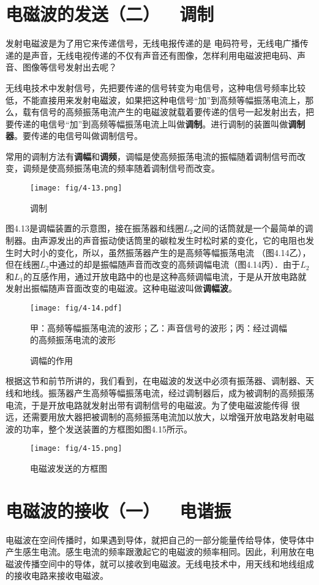 \section{电磁波的发送（二）~~调制}
发射电磁波是为了用它来传递信号，无线电报传递的是
电码符号，无线电广播传递的是声音，无线电视传递的不仅有声音还有图像，怎样利用电磁波把电码、声音、图像等信号发射出去呢？

无线电技术中发射信号，先把要传递的信号转变为电信号，这种电信号频率比较低，不能直接用来发射电磁波，如果把这种电信号“加”到高频等幅振荡电流上，那么，载有信号的高频振荡电流产生的电磁波就载着要传递的信号一起发射出去，把要传递的电信号“加”到高频等幅振荡电流上叫做\textbf{调制}。进行调制的装置叫做\textbf{调制器}。要传递的电信号叫做调制信号。

常用的调制方法有\textbf{调幅}和\textbf{调频}，调幅是使高频振荡电流的振幅随着调制信号而改变，调频是使高频振荡电流的频率随着调制信号而改变。
\begin{figure}[htp]\centering
\texttt{[image: fig/4-13.png]}
\caption{调制}
\end{figure}

图4.13是调幅装置的示意图，接在振荡器和线圈$L_2$之间的话筒就是一个最简单的调制器。由声源发出的声音振动使话筒里的碳粒发生时松时紧的变化，它的电阻也发生时大时小的变化，所以，虽然振荡器产生的是高频等幅振荡电流
（图4.14乙），但在线圈$L_2$中通过的却是振幅随声音而改变的高频调幅电流（图4.14丙）．由于$L_2$和$L_1$的互感作用，通过开放电路中的也是这种高频调幅电流，于是从开放电路就发射出振幅随声音面改变的电磁波。这种电磁波叫做\textbf{调幅波}。
\begin{figure}[htp]\centering
	\texttt{[image: fig/4-14.pdf]}
	
	甲：高频等幅振荡电流的波形；乙：声音信号的波形；丙：经过调幅的高频振荡电流的波形
	\caption{调幅的作用}
	\end{figure}

根据这节和前节所讲的，我们看到，在电磁波的发送中必须有振荡器、调制器、天线和地线。振荡器产生高频等幅振荡电流，经过调制器后，成为被调制的高频振荡电流，于是开放电路就发射出带有调制信号的电磁波。为了使电磁波能传得
很远，还需要用放大器把被调制的高频振荡电流加以放大，以增强开放电路发射电磁波的功率，整个发送装置的方框图如图4.15所示。
\begin{figure}[htp]\centering
\texttt{[image: fig/4-15.png]}
\caption{电磁波发送的方框图}
\end{figure}

\section{电磁波的接收（一）~~电谐振}
电磁波在空间传播时，如果遇到导体，就把自己的一部分能量传给导体，使导体中产生感生电流。感生电流的频率跟激起它的电磁波的频率相同。因此，利用放在电磁波传播空间中的导体，就可以接收到电磁波。无线电技术中，用天线和地线组成的接收电路来接收电磁波。

